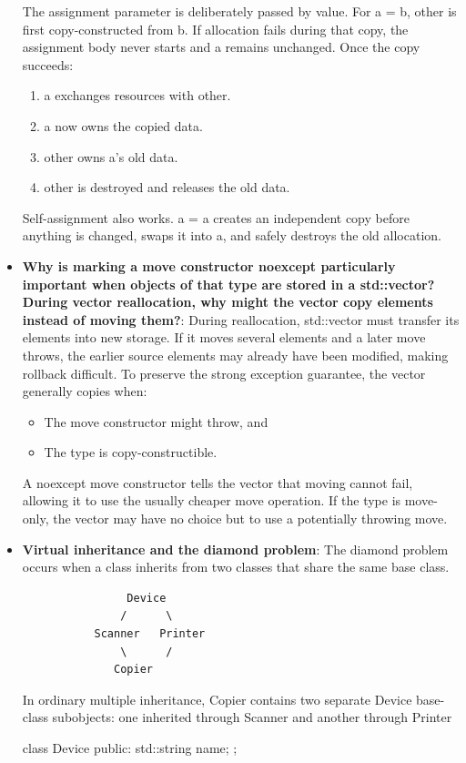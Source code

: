 \documentclass{report}
\begin{document}
\begin{itemize}
\begin{cppcode}
                Buffer& operator=(Buffer other) {
                    swap(*this, other);
                    return *this;
                }
            };
            \end{cppcode}
            \bigbreak \noindent 
            The assignment parameter is deliberately passed by value. For a = b, other is first copy-constructed from b. If allocation fails during that copy, the assignment body never starts and a remains unchanged. Once the copy succeeds:
            \begin{enumerate}
                \item a exchanges resources with other.
                \item a now owns the copied data.
                \item other owns a’s old data.
                \item other is destroyed and releases the old data.
            \end{enumerate}
            Self-assignment also works. a = a creates an independent copy before anything is changed, swaps it into a, and safely destroys the old allocation.
        \item \textbf{Why is marking a move constructor noexcept particularly important when objects of that type are stored in a std::vector? During vector reallocation, why might the vector copy elements instead of moving them?}: During reallocation, std::vector must transfer its elements into new storage. If it moves several elements and a later move throws, the earlier source elements may already have been modified, making rollback difficult.
            \bigbreak \noindent 
            To preserve the strong exception guarantee, the vector generally copies when:
            \begin{itemize}
                \item The move constructor might throw, and
                \item The type is copy-constructible.
            \end{itemize}
            A noexcept move constructor tells the vector that moving cannot fail, allowing it to use the usually cheaper move operation. If the type is move-only, the vector may have no choice but to use a potentially throwing move.
        \item \textbf{Virtual inheritance and the diamond problem}: The diamond problem occurs when a class inherits from two classes that share the same base class.
            \begin{verbatim}
                Device
               /      \
           Scanner   Printer
               \      /
              Copier
            \end{verbatim}
            \bigbreak \noindent 
            In ordinary multiple inheritance, Copier contains two separate Device base-class subobjects: one inherited through Scanner and another through Printer
            \bigbreak \noindent 
            \begin{cppcode}
            class Device {
                public:
                std::string name;
            };


\end{cppcode}
\end{itemize}
\end{document}
